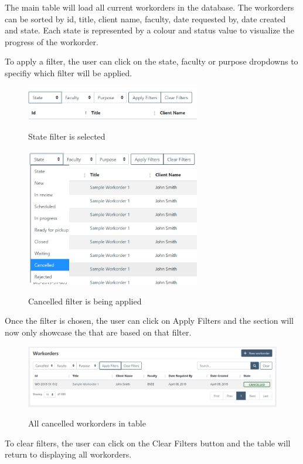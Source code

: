 The main table will load all current workorders in the database. The workorders can be sorted by id, title, client name, faculty, date requested by, date created and state. Each state is represented by a colour and status value to visualize the progress of the workorder. 
\newline
{\setlength{\parindent}{0cm}

To apply a filter, the user can click on the state, faculty or purpose dropdowns to specifiy which filter will be applied. 
\begin{figure}[H]
	\centering
	\includegraphics[width=3in]{Filter.png}\\
	\caption{State filter is selected}
	\label{fig:tobias}
\end{figure}
\begin{figure}[H]
	\centering
	\includegraphics[width=3in]{filter-selected.png}\\
	\caption{Cancelled filter is being applied}
	\label{fig:tobias}
\end{figure}

Once the filter is chosen, the user can click on Apply Filters and the section will now only showcase the that are based on that filter.
\begin{figure}[H]
	\centering
	\includegraphics[width=5in]{cancelled.png}\\
	\caption{All cancelled workorders in table}
	\label{fig:tobias}
\end{figure}
To clear filters, the user can click on the Clear Filters button and the table will return to displaying all workorders. 
\newline
{\setlength{\parindent}{0cm}

}}
